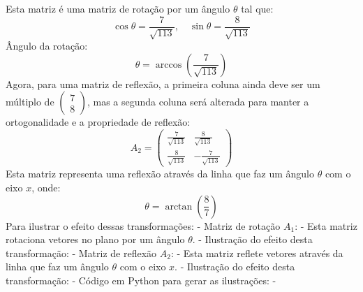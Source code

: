 Esta matriz é uma matriz de rotação por um ângulo \(\theta\) tal que:
\[
\cos \theta = \frac{7}{\sqrt{113}}, \quad \sin \theta = \frac{8}{\sqrt{113}}
\]
Ângulo da rotação:
\[
\theta = \arccos\left(\frac{7}{\sqrt{113}}\right)
\]
Agora, para uma matriz de reflexão, a primeira coluna ainda deve ser um múltiplo de \(\begin{pmatrix} 7 \\ 8 \end{pmatrix}\), mas a segunda coluna será alterada para manter a ortogonalidade e a propriedade de reflexão:
\[
A_2 = \left(\begin{array}{cc} \frac{7}{\sqrt{113}} & \frac{8}{\sqrt{113}} \\ \frac{8}{\sqrt{113}} & -\frac{7}{\sqrt{113}} \end{array}\right)
\]
Esta matriz representa uma reflexão através da linha que faz um ângulo \(\theta\) com o eixo \(x\), onde:
\[
\theta = \arctan\left(\frac{8}{7}\right)
\]
Para ilustrar o efeito dessas transformações:
-
Matriz de rotação \(A_1\):
    - Esta matriz rotaciona vetores no plano por um ângulo \(\theta\).
    - Ilustração do efeito desta transformação:
 -
Matriz de reflexão \(A_2\):
    - Esta matriz reflete vetores através da linha que faz um ângulo \(\theta\) com o eixo \(x\).
    - Ilustração do efeito desta transformação:
 -
Código em Python para gerar as ilustrações:
 -
